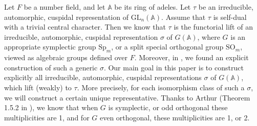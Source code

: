 \documentclass[12pts]{amsart}
\newcommand{\BA}{{\mathbb {A}}}
\newcommand{\GL}{{\mathrm{GL}}}
\newcommand{\SO}{{\mathrm{SO}}}
\newcommand{\Sp}{{\mathrm{Sp}}}
\begin{document}
Let $F$ be a number field, and let $\BA$ be its ring of adeles. Let $\tau$ be an irreducible, automorphic, cuspidal representation of $\GL_n(\BA)$. Assume that $\tau$ is self-dual with a trivial central character. Then we know that $\tau$ is the functorial lift of an irreducible, automorphic, cuspidal representation $\sigma$ of $G(\BA)$, where $G$ is an appropriate symplectic group $\Sp_m$, or a split special orthogonal group $\SO_m$, viewed as algebraic groups defined over $F$. Moreover, in \cite{GRS11}, we found an explicit construction of such a generic $\sigma$. Our main goal in this paper is to construct explicitly all irreducible, automorphic, cuspidal representations $\sigma$ of $G(\BA)$, which lift (weakly) to $\tau$. More precisely, for each isomorphism class of such a $\sigma$, we will construct a certain unique representative. Thanks to Arthur (Theorem 1.5.2 in \cite{A13}), we know that when $G$ is symplectic, or odd orthogonal these multiplicities are 1, and for $G$ even orthogonal, these multiplicities are 1, or 2.
\end{document}
